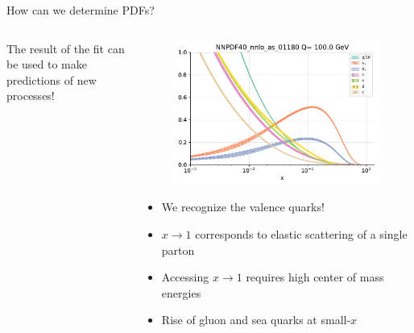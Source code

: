 \documentclass[8pt,t]{beamer}
\begin{document}
\begin{frame}{How can we determine PDFs?}
\begin{columns}
\begin{column}{0.5\textwidth}
      The result of the fit can be used to make predictions of new processes!
    \end{column}
    \begin{column}{0.5\textwidth}
      \begin{figure}
        \includegraphics[width=0.99\textwidth]{pdg_100gev.pdf}
      \end{figure}
      \begin{itemize}
        \item We recognize the valence quarks!
        \item $x\rightarrow 1$ corresponds to elastic scattering of a single parton
        \item Accessing $x\rightarrow 1$ requires high center of mass energies
        \item Rise of gluon and sea quarks at small-$x$
      \end{itemize}
    \end{column}
  \end{columns}
\end{frame}
\end{document}
